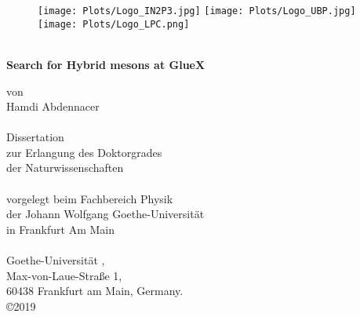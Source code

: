 
\begin{titlepage}
\thispagestyle{empty}
\setlength{\unitlength}{1mm}

\begin{figure}[t]
\centering
\texttt{[image: Plots/Logo\_IN2P3.jpg]}
\hspace{2cm}
\texttt{[image: Plots/Logo\_UBP.jpg]}
\hspace{2cm}
\texttt{[image: Plots/Logo\_LPC.png]}
\end{figure}
\vspace{2cm}
\begin{center}
\mbox{}\\[20mm]
{\huge\bf Search for Hybrid mesons at GlueX}\par
\vspace{2cm}
{von}
\vspace{5mm}\\
{\LARGE Hamdi Abdennacer}\\
\mbox{}\\[2cm]
{\Large Dissertation\\
zur Erlangung des Doktorgrades\\
der Naturwissenschaften}\\
\mbox{}\\[2cm]
{\large vorgelegt beim Fachbereich Physik\\
der Johann Wolfgang Goethe-Universit\"at \\
in Frankfurt Am Main}\\
\mbox{}\\[2cm]
{Goethe-Universit\"at , \\
Max-von-Laue-Straße 1, \\
60438 Frankfurt am Main, Germany.}\\
\vspace{3mm}
{\copyright 2019}
\end{center}

\newpage
\thispagestyle{empty}
\end{titlepage}